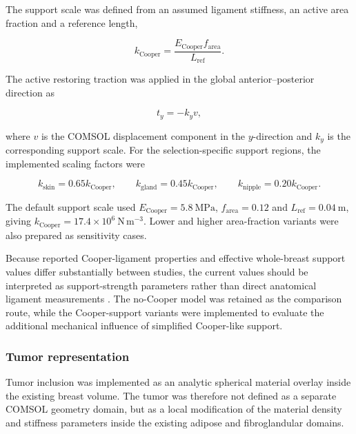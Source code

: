 The support scale was defined from an assumed ligament stiffness, an active area fraction and a reference length,

\begin{equation}
k_{\mathrm{Cooper}}
=
\frac{E_{\mathrm{Cooper}} f_{\mathrm{area}}}{L_{\mathrm{ref}}}.
\label{cooper_support_scale_from_area_fraction}
\end{equation}

The active restoring traction was applied in the global anterior--posterior direction as

\begin{equation}
t_{y}
=
-k_{y}v,
\label{cooper_y_restoring_traction}
\end{equation}

where $v$ is the COMSOL displacement component in the $y$-direction and $k_{y}$ is the corresponding support scale. For the selection-specific support regions, the implemented scaling factors were

\begin{equation}
k_{\mathrm{skin}}
=
0.65k_{\mathrm{Cooper}},
\qquad
k_{\mathrm{gland}}
=
0.45k_{\mathrm{Cooper}},
\qquad
k_{\mathrm{nipple}}
=
0.20k_{\mathrm{Cooper}}.
\label{cooper_selection_specific_support_scales}
\end{equation}

The default support scale used $E_{\mathrm{Cooper}}=5.8~\mathrm{MPa}$, $f_{\mathrm{area}}=0.12$ and $L_{\mathrm{ref}}=0.04~\mathrm{m}$, giving $k_{\mathrm{Cooper}}=17.4\times10^{6}~\mathrm{N\,m^{-3}}$. Lower and higher area-fraction variants were also prepared as sensitivity cases.

Because reported Cooper-ligament properties and effective whole-breast support values differ substantially between studies, the current values should be interpreted as support-strength parameters rather than direct anatomical ligament measurements \cite{Teixeira2023,Chen2025}. The no-Cooper model was retained as the comparison route, while the Cooper-support variants were implemented to evaluate the additional mechanical influence of simplified Cooper-like support.

\subsubsection{Tumor representation}
\label{tumor_representation}

Tumor inclusion was implemented as an analytic spherical material overlay inside the existing breast volume. The tumor was therefore not defined as a separate COMSOL geometry domain, but as a local modification of the material density and stiffness parameters inside the existing adipose and fibroglandular domains.

